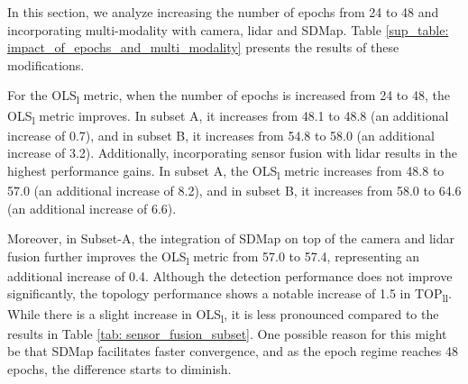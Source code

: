 \begin{table}[t]
\centering
\caption{Impact of number of epochs and multi-modality on TopoBDA in OpenLane-V2 with V1.1m Metric Baseline.}
\label{sup_table: impact_of_epochs_and_multi_modality}
\end{table}

In this section, we analyze increasing the number of epochs from 24 to 48 and incorporating multi-modality with camera, lidar and SDMap. Table \ref{sup_table: impact_of_epochs_and_multi_modality} presents the results of these modifications.

For the OLS\textsubscript{l} metric, when the number of epochs is increased from 24 to 48, the OLS\textsubscript{l} metric improves. In subset A, it increases from 48.1 to 48.8 (an additional increase of 0.7), and in subset B, it increases from 54.8 to 58.0 (an additional increase of 3.2). Additionally, incorporating sensor fusion with lidar results in the highest performance gains. In subset A, the OLS\textsubscript{l} metric increases from 48.8 to 57.0 (an additional increase of 8.2), and in subset B, it increases from 58.0 to 64.6 (an additional increase of 6.6).

Moreover, in Subset-A, the integration of SDMap on top of the camera and lidar fusion further improves the OLS\textsubscript{l} metric from 57.0 to 57.4, representing an additional increase of 0.4. Although the detection performance does not improve significantly, the topology performance shows a notable increase of 1.5 in TOP\textsubscript{ll}. While there is a slight increase in OLS\textsubscript{l}, it is less pronounced compared to the results in Table \ref{tab: sensor_fusion_subset}. One possible reason for this might be that SDMap facilitates faster convergence, and as the epoch regime reaches 48 epochs, the difference starts to diminish.

